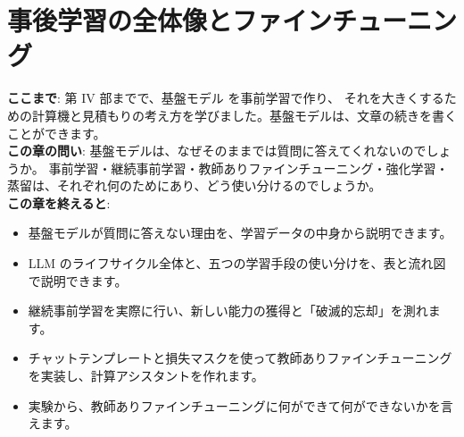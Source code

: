 \chapter{事後学習の全体像とファインチューニング}\label{ch:posttraining}

\begin{chapterlead}
\textbf{ここまで}: 第 IV 部までで、基盤モデル  を事前学習で作り、
それを大きくするための計算機と見積もりの考え方を学びました。基盤モデルは、文章の続きを書くことができます。\\
\textbf{この章の問い}: 基盤モデルは、なぜそのままでは質問に答えてくれないのでしょうか。
事前学習・継続事前学習・教師ありファインチューニング・強化学習・蒸留は、それぞれ何のためにあり、どう使い分けるのでしょうか。\\[1mm]
\textbf{この章を終えると}:
\begin{itemize}
\item 基盤モデルが質問に答えない理由を、学習データの中身から説明できます。
\item LLM のライフサイクル全体と、五つの学習手段の使い分けを、表と流れ図で説明できます。
\item 継続事前学習を実際に行い、新しい能力の獲得と「破滅的忘却」を測れます。
\item チャットテンプレートと損失マスクを使って教師ありファインチューニングを実装し、計算アシスタントを作れます。
\item 実験から、教師ありファインチューニングに何ができて何ができないかを言えます。
\end{itemize}
\end{chapterlead}

